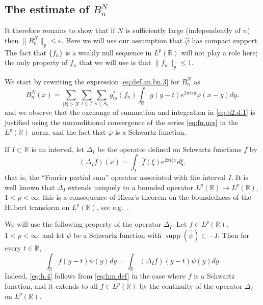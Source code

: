 \documentclass[reqno,a4paper,12pt]{amsart}
\numberwithin{equation}{section}
\numberwithin{figure}{section}
\newcommand\R{\mathbb{R}}
\newcommand\Del{\Delta}
\newcommand\1{\mathds{1}}
\newcommand\eps{\varepsilon}
\newcommand{\pphi}{\varphi}
\newcommand{\TTT}{T}
\newcommand{\SSS}{S}
\renewcommand\le{\leqslant}
\newcommand\sbt{\subset}
\newcommand{\ft}[1]{\widehat{#1}}
\newcommand{\supp}{\operatorname{supp}}
\theoremstyle{plain}
\theoremstyle{definition}
\begin{document}
\subsection{The estimate of $B^N_n$}
It therefore remains to show that if $N$ is   sufficiently large 
(independently of $n$)
then $\|B^N_n\|_p \le \eps$. Here we will use our 
assumption that 
$\ft{\pphi}$ has compact support. The fact 
that $\{f_n\}$ is a weakly null sequence in $L^p(\R)$
will not play a role here;  the only property of $f_n$
that we will use is that $\|f_n\|_p\le 1$. 

We start by rewriting the expression \eqref{eq:def.an.bn.3} for $B^N_n$ as 
\begin{equation}
\label{eq:b2.d.1}
B^N_n(x) = \sum_{|k| > N} \sum_{t\in \TTT} \sum_{s\in \SSS_k}
g_{ts}^*(f_n)  \int_\R  g(y-t) e^{2\pi i s y} \pphi(x-y) dy,
\end{equation}
and we observe that the exchange of summation and integration in \eqref{eq:b2.d.1}
is justified using the 
unconditional convergence of the series \eqref{eq:fn.ucs}
in the $L^p(\R)$ norm, and the fact that $\pphi$ is a Schwartz function.




If $I \sbt \R$ is an interval, let $\Delta_I$
be the operator defined 
on Schwartz functions $f$ by
\begin{equation}
\label{eq:hm.def}
(\Delta_I  f)(x) = \int_{I}
\ft{f}(\xi) e^{2 \pi i \xi x} d \xi,
\end{equation}
that is, the ``Fourier partial sum'' operator associated with the interval $I$.
It is well known that $\Del_I$ extends uniquely to a bounded operator
$L^p(\R) \to L^p(\R)$, $1 <  p < \infty$;
this is a consequence
 of Riesz's theorem on the boundedness
of the Hilbert transform on $L^p(\R)$, 
see e.g.\ \cite[Chapter IV, Section 4.1, Theorem 4]{Ste70}.



We will use the following property of the operator
$\Delta_I$: Let  $f \in L^p(\R)$, $1 < p < \infty$, and let
$\psi$ be a Schwartz function with $\supp(\ft{\psi}) \sbt - I$.
Then for every $t \in \R$,
\begin{equation}
\label{eq:h.4}
\int_{\R} f  (y-t)  \psi(y)  dy = 
\int_{\R} (\Del_I f)  (y-t)  \psi(y)  dy.
\end{equation}
Indeed, \eqref{eq:h.4} follows from
\eqref{eq:hm.def} in the case where $f$ is a Schwartz function,
and it extends to all   $f \in L^p(\R)$
by the continuity of
the operator $\Del_I$ on $L^p(\R) $.
\end{document}
